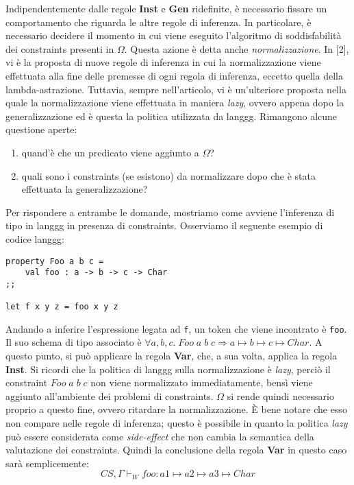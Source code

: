 \documentclass[10pt,a4paper]{article}
\begin{document}
Indipendentemente dalle regole \textbf{Inst} e \textbf{Gen} ridefinite, è necessario fissare un comportamento che
riguarda le altre regole di inferenza. In particolare, è necessario decidere il momento in cui viene eseguito l'algoritmo
di soddisfabilità dei constraints presenti in $ \Omega $. Questa azione è detta anche \textit{normalizzazione}.
In [2], vi è la proposta di nuove regole di inferenza in cui la normalizzazione viene effettuata alla fine delle
premesse di ogni regola di inferenza, eccetto quella della lambda-astrazione. Tuttavia, sempre nell'articolo, vi è
un'ulteriore proposta nella quale la normalizzazione viene effettuata in maniera \textit{lazy}, ovvero appena dopo
la generalizzazione ed è questa la politica utilizzata da langgg. Rimangono alcune questione aperte:
\begin{enumerate}
    \item quand'è che un predicato viene aggiunto a $ \Omega $?
    \item quali sono i constraints (se esistono) da normalizzare dopo che è stata effettuata la generalizzazione?
\end{enumerate}
Per rispondere a entrambe le domande, mostriamo come avviene l'inferenza di tipo in langgg in presenza di constraints.
Osserviamo il seguente esempio di codice langgg:
\begin{lstlisting}
property Foo a b c =
    val foo : a -> b -> c -> Char
;;

let f x y z = foo x y z
\end{lstlisting}
Andando a inferire l'espressione legata ad \texttt{f}, un token che viene incontrato è \texttt{foo}. Il suo schema di
tipo associato è $ \forall a, b, c. \; Foo \; a \; b \; c \Rightarrow a \mapsto b \mapsto c \mapsto Char $. A questo
punto, si può applicare la regola \textbf{Var}, che, a sua volta, applica la regola
\textbf{Inst}. Si ricordi che la politica di langgg sulla normalizzazione è \textit{lazy}, perciò
il constraint $ Foo \; a \; b \; c $ non viene normalizzato immediatamente, bensì viene aggiunto all'ambiente dei
problemi di constraints. $ \Omega $ si rende quindi necessario proprio a questo fine, ovvero ritardare la normalizzazione.
\`E bene notare che esso non compare nelle regole di inferenza; questo è possibile in quanto la politica \textit{lazy}
può essere considerata come \textit{side-effect} che non cambia la semantica della valutazione dei constraints.
Quindi la conclusione della regola \textbf{Var} in questo caso sarà semplicemente:
\[ CS, \Gamma \vdash_W foo : a1 \mapsto a2 \mapsto a3 \mapsto Char \]
\end{document}

